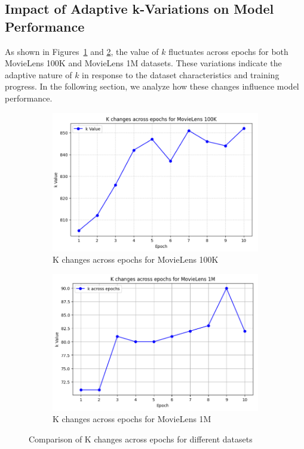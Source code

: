 \subsection {Impact of Adaptive k-Variations on Model Performance}
As shown in Figures~\ref{fig:k_changes_100K} and \ref{fig:k_changes_1M}, the value of $k$ fluctuates across epochs for both MovieLens 100K and MovieLens 1M datasets. These variations indicate the adaptive nature of $k$ in response to the dataset characteristics and training progress. In the following section, we analyze how these changes influence model performance.  

\begin{figure}[htbp]
	\centering
	\begin{subfigure}{0.48\textwidth}
		\centering
		\includegraphics[width=\linewidth]{Figures/CHAGES_OF_K_FOR_100k.png}
		\caption{K changes across epochs for MovieLens 100K}
		\label{fig:k_changes_100K}
	\end{subfigure}
	\hfill
	\begin{subfigure}{0.48\textwidth}
		\centering
		\includegraphics[width=\linewidth]{Figures/chnages_inK_for_1M.png}
		\caption{K changes across epochs for MovieLens 1M}
		\label{fig:k_changes_1M}
	\end{subfigure}
	\caption{Comparison of K changes across epochs for different datasets}
	\label{fig:k_changes}
\end{figure}
